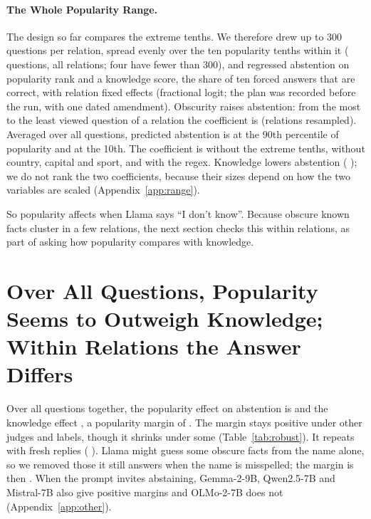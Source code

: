 \documentclass[11pt]{article}
\newcommand{\idk}{``I don't know''}
\begin{document}
\paragraph{The Whole Popularity Range.} The design so far compares the extreme tenths. We therefore drew up to 300 questions per relation, spread evenly over the ten popularity tenths within it (\xtAllN{} questions, all \xtRel{} relations; four have fewer than 300), and regressed abstention on popularity rank and a knowledge score, the share of ten forced answers that are correct, with relation fixed effects (fractional logit; the plan was recorded before the run, with one dated amendment). Obscurity raises abstention: from the most to the least viewed question of a relation the coefficient is \xtAll{} \xtAllCI{} (relations resampled). Averaged over all questions, predicted abstention is \xtPredPop{} at the 90th percentile of popularity and \xtPredObs{} at the 10th. The coefficient is \xtMid{} \xtMidCI{} without the extreme tenths, \xtNoThree{} \xtNoThreeCI{} without country, capital and sport, and \xtAllRegex{} \xtAllRegexCI{} with the regex. Knowledge lowers abstention (\xtKnow{} \xtKnowCI); we do not rank the two coefficients, because their sizes depend on how the two variables are scaled (Appendix~\ref{app:range}).

So popularity affects when Llama says \idk. Because obscure known facts cluster in a few relations, the next section checks this within relations, as part of asking how popularity compares with knowledge.

\section{Over All Questions, Popularity Seems to Outweigh Knowledge; Within Relations the Answer Differs}
\label{sec:relations}

Over all questions together, the popularity effect on abstention is \hmLlamaPopEff{} \hmLlamaPopEffCI{} and the knowledge effect \hmLlamaKnowEff{} \hmLlamaKnowEffCI, a popularity margin of \hmLlamaDiff{} \hmLlamaDiffCI. The margin stays positive under other judges and labels, though it shrinks under some (Table~\ref{tab:robust}). It repeats with fresh replies (\frDiff{} \frDiffCI). Llama might guess some obscure facts from the name alone, so we removed those it still answers when the name is misspelled; the margin is then \ncDiff{} \ncDiffCI. When the prompt invites abstaining, Gemma-2-9B, Qwen2.5-7B and Mistral-7B also give positive margins and OLMo-2-7B does not (Appendix~\ref{app:other}).
\end{document}

